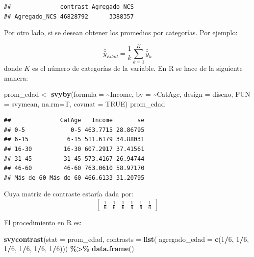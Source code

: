 \documentclass[
  spanish,
  12pt,
]{book}
\newenvironment{Shaded}{\begin{snugshade}}{\end{snugshade}}
\newcommand{\AttributeTok}[1]{\textcolor[rgb]{0.13,0.29,0.53}{#1}}
\newcommand{\ConstantTok}[1]{\textcolor[rgb]{0.56,0.35,0.01}{#1}}
\newcommand{\DecValTok}[1]{\textcolor[rgb]{0.00,0.00,0.81}{#1}}
\newcommand{\FunctionTok}[1]{\textcolor[rgb]{0.13,0.29,0.53}{\textbf{#1}}}
\newcommand{\NormalTok}[1]{#1}
\newcommand{\OtherTok}[1]{\textcolor[rgb]{0.56,0.35,0.01}{#1}}
\newcommand{\SpecialCharTok}[1]{\textcolor[rgb]{0.81,0.36,0.00}{\textbf{#1}}}
\begin{document}
\begin{verbatim}
##              contrast Agregado_NCS
## Agregado_NCS 46828792      3388357
\end{verbatim}

Por otro lado, si se desean obtener los promedios por categorías. Por ejemplo:

\[
\hat{\bar{y}}_{Edad} = \frac{1}{k}\sum_{k=1}^K\hat{\bar{y}}_{k}
\]
donde \(K\) es el número de categorías de la variable. En R se hace de la siguiente manera:

\begin{Shaded}
\begin{Highlighting}[]
\NormalTok{prom\_edad }\OtherTok{\textless{}{-}} \FunctionTok{svyby}\NormalTok{(}\AttributeTok{formula =} \SpecialCharTok{\textasciitilde{}}\NormalTok{Income,}
                   \AttributeTok{by =} \SpecialCharTok{\textasciitilde{}}\NormalTok{CatAge,}
                   \AttributeTok{design =}\NormalTok{  diseno,}
                   \AttributeTok{FUN =}\NormalTok{ svymean,}
                   \AttributeTok{na.rm=}\NormalTok{T,}
                   \AttributeTok{covmat =} \ConstantTok{TRUE}\NormalTok{)}
\NormalTok{prom\_edad}
\end{Highlighting}
\end{Shaded}

\begin{verbatim}
##              CatAge   Income       se
## 0-5             0-5 463.7715 28.86795
## 6-15           6-15 511.6179 34.88031
## 16-30         16-30 607.2917 37.41561
## 31-45         31-45 573.4167 26.94744
## 46-60         46-60 763.0610 58.97170
## Más de 60 Más de 60 466.6133 31.20795
\end{verbatim}

Cuya matriz de contraste estaría dada por:
\[
\left[\begin{array}{cccccc}
\frac{1}{6} & \frac{1}{6} & \frac{1}{6} & \frac{1}{6} & \frac{1}{6} & \frac{1}{6}
\end{array}\right]
\]

El procedimiento en R es:

\begin{Shaded}
\begin{Highlighting}[]
\FunctionTok{svycontrast}\NormalTok{(}\AttributeTok{stat =}\NormalTok{ prom\_edad,}
            \AttributeTok{contrasts =} \FunctionTok{list}\NormalTok{(}
                             \AttributeTok{agregado\_edad =} \FunctionTok{c}\NormalTok{(}\DecValTok{1}\SpecialCharTok{/}\DecValTok{6}\NormalTok{, }\DecValTok{1}\SpecialCharTok{/}\DecValTok{6}\NormalTok{, }\DecValTok{1}\SpecialCharTok{/}\DecValTok{6}\NormalTok{, }\DecValTok{1}\SpecialCharTok{/}\DecValTok{6}\NormalTok{, }\DecValTok{1}\SpecialCharTok{/}\DecValTok{6}\NormalTok{, }\DecValTok{1}\SpecialCharTok{/}\DecValTok{6}\NormalTok{)))             }\SpecialCharTok{\%\textgreater{}\%} \FunctionTok{data.frame}\NormalTok{()}
\end{Highlighting}
\end{Shaded}
\end{document}

